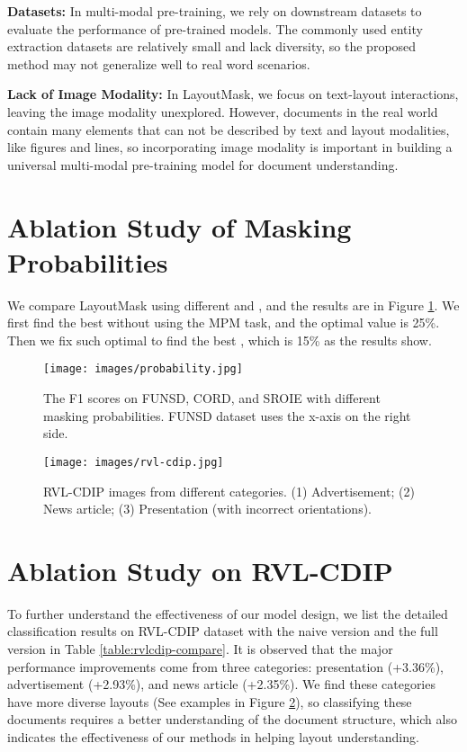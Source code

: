 \documentclass[11pt]{article}
\begin{document}
\noindent\textbf{Datasets:}
In multi-modal pre-training, we rely on downstream datasets to evaluate the performance of pre-trained models.
The commonly used entity extraction datasets are relatively small and lack diversity, so the proposed method may not generalize well to real word scenarios.

\noindent\textbf{Lack of Image Modality:}
In LayoutMask, we focus on text-layout interactions, leaving the image modality unexplored.
However, documents in the real world contain many elements that can not be described by text and layout modalities, like figures and lines, so incorporating image modality is important in building a universal multi-modal pre-training model for document understanding.  






\newpage
\appendix

\section{Ablation Study of Masking Probabilities}
\label{appendix:masking-p}
We compare LayoutMask using different  and , and the results are in Figure \ref{fig:probability}.
We first find the best  without using the MPM task, and the optimal value is 25\%. 
Then we fix such optimal  to find the best , which is 15\% as the results show.


\label{sec:ablation-method}
\begin{figure}[!tb]
	\centering
	\texttt{[image: images/probability.jpg]}
	\caption{The F1 scores on FUNSD, CORD, and SROIE with different masking probabilities. FUNSD dataset uses the x-axis on the right side.}
	\label{fig:probability}
\end{figure}

\begin{figure}[!tb]
	\centering
	\texttt{[image: images/rvl-cdip.jpg]}
	\caption{ RVL-CDIP images from different categories. (1) Advertisement; (2) News article; (3) Presentation (with incorrect orientations).}
	\label{fig:rvl-cdip}
\end{figure}

\section{Ablation Study on RVL-CDIP}
\label{appendix:rvl-cdip}
To further understand the effectiveness of our model design, we list the detailed classification results on RVL-CDIP dataset with the naive version and the full version in Table \ref{table:rvlcdip-compare}.  
It is observed that the major performance improvements come from three categories: presentation (+3.36\%), advertisement (+2.93\%), and news article (+2.35\%).
We find these categories have more diverse layouts (See examples in Figure \ref{fig:rvl-cdip}), so classifying these documents requires a better understanding of the document structure, which also indicates the effectiveness of our methods in helping layout understanding.  
\end{document}
